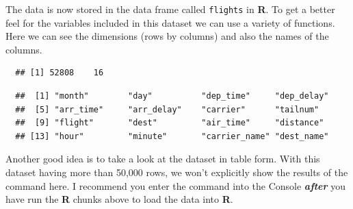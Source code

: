 \documentclass[12pt,twoside]{reedthesis}
\theoremstyle{definition}
\theoremstyle{definition}
\theoremstyle{remark}
\begin{document}
  \begin{Shaded}
  \begin{Highlighting}[]
  \StringTok{ }\NormalTok{(}\NormalTok{)}
  \end{Highlighting}
  \end{Shaded}
  
  The data is now stored in the data frame called \texttt{flights} in
  \textbf{R}. To get a better feel for the variables included in this
  dataset we can use a variety of functions. Here we can see the
  dimensions (rows by columns) and also the names of the columns.
  
  \begin{Shaded}
  \begin{Highlighting}[]
  \end{Highlighting}
  \end{Shaded}
  
  \begin{verbatim}
  ## [1] 52808    16
  \end{verbatim}
  
  \begin{Shaded}
  \begin{Highlighting}[]
  \end{Highlighting}
  \end{Shaded}
  
  \begin{verbatim}
  ##  [1] "month"        "day"          "dep_time"     "dep_delay"   
  ##  [5] "arr_time"     "arr_delay"    "carrier"      "tailnum"     
  ##  [9] "flight"       "dest"         "air_time"     "distance"    
  ## [13] "hour"         "minute"       "carrier_name" "dest_name"
  \end{verbatim}
  
  Another good idea is to take a look at the dataset in table form. With
  this dataset having more than 50,000 rows, we won't explicitly show the
  results of the command here. I recommend you enter the command into the
  Console \textbf{\emph{after}} you have run the \textbf{R} chunks above
  to load the data into \textbf{R}.
  
  \begin{Shaded}
  \begin{Highlighting}[]
  \end{Highlighting}
  \end{Shaded}
  
\end{document}
